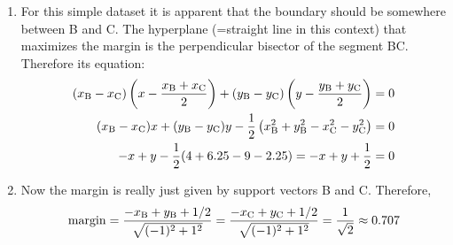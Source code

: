 \documentclass[a4paper, 10pt]{article}
\newcommand{\annot}[1]{{\rm #1}}
\begin{document}
\begin{enumerate}[label=(\alph*)]
    \item For this simple dataset it is apparent that the boundary should be somewhere between B and C. The hyperplane (=straight line in this context) that maximizes the margin is the perpendicular bisector of the segment BC. Therefore its equation:
    \begin{equation}
        \begin{aligned}
            (x_\annot{B} - x_\annot{C})\left(x - \frac{x_\annot{B} + x_\annot{C}}{2}\right) + (y_\annot{B} - y_\annot{C})\left(y - \frac{y_\annot{B} + y_\annot{C}}{2}\right) &= 0 \\
            (x_\annot{B} - x_\annot{C})x + (y_\annot{B} - y_\annot{C})y - \frac{1}{2}\left(x_\annot{B}^2 + y_\annot{B}^2 - x_\annot{C}^2 - y_\annot{C}^2\right) &= 0 \\
            - x + y - \frac{1}{2}(4 + 6.25 - 9 - 2.25) = -x + y + \frac{1}{2} &= 0
        \end{aligned}
    \end{equation}
    
    \item Now the margin is really just given by support vectors B and C. Therefore, 
    \begin{equation}
        \annot{margin} = \frac{-x_\annot{B} + y_\annot{B} + 1/2}{\sqrt{(-1)^2 + 1^2}} = \frac{-x_\annot{C} + y_\annot{C} + 1/2}{\sqrt{(-1)^2 + 1^2}} = \frac{1}{\sqrt{2}} \approx 0.707
    \end{equation}
    

\end{enumerate}
\end{document}
